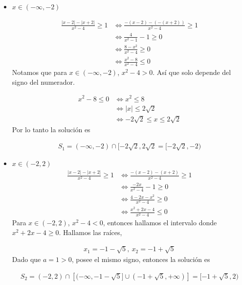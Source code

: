 \documentclass[12pt]{book}
\begin{document}
\begin{itemize}
    \item $x \in (-\infty,-2)$ 

    \begin{align*}
          \frac{|x-2|-|x+2|}{x^2-4} \geq 1 &\Longleftrightarrow \frac{-(x-2)-(-(x+2))}{x^2-4} \geq 1 \\
          &\Longleftrightarrow \frac{4}{x^2-1}-1 \geq 0 \\
          &\Longleftrightarrow \frac{8-x^2}{x^2-4} \geq 0 \\
          &\Longleftrightarrow \frac{x^2-8}{x^2-4} \leq 0
    \end{align*}
    Notamos que para $x \in (-\infty,-2)$, $x^2 -4 >0$. Así que solo depende del signo del numerador. 

    \begin{align*}
        x^2-8 \leq 0   &\Longleftrightarrow x^2\leq 8 \\
          &\Longleftrightarrow |x| \leq 2\sqrt{2}\\
            &\Longleftrightarrow -2\sqrt{2}\leq x \leq 2\sqrt{2}
    \end{align*}
    Por lo tanto la solución es 

    \begin{align*}
        S_1=(-\infty,-2) \cap [-2\sqrt{2},2\sqrt{2}=[-2\sqrt{2},-2)
    \end{align*}

    \item $x \in (-2,2)$
\begin{align*}
    \frac{|x-2|-|x+2|}{x^2-4} \geq 1 &\Longleftrightarrow \frac{-(x-2)-(x+2)}{x^2-4} \geq 1 \\
     &\Longleftrightarrow  \frac{-2x}{x^2-4}-1\geq 0 \\
      &\Longleftrightarrow \frac{4-2x-x^2}{x^2-4} \geq0 \\
       &\Longleftrightarrow  \frac{x^2+2x-4}{x^2-4} \leq 0
\end{align*}
Para $x \in (-2,2)$, $x^2-4 <0$, entonces hallamos el intervalo donde $x^2+2x-4 \geq 0$. Hallamos las raíces, 

\begin{align*}
    x_1=-1-\sqrt{5}, \ x_2 =-1+\sqrt{5}
\end{align*}
Dado que $a=1>0$, posee el mismo signo, entonces la solución es 

\begin{align*}
    S_2 =(-2,2) \cap \left[(-\infty, -1-\sqrt{5}] \cup (-1+\sqrt{5},+\infty)\right]=[-1+\sqrt{5},2)
\end{align*}


\end{itemize}
\end{document}
